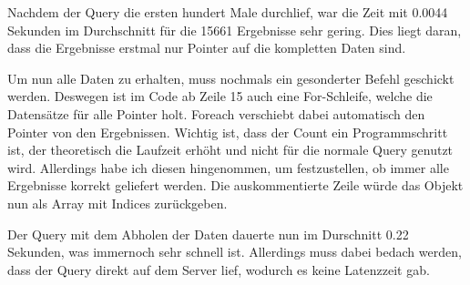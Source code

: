 Nachdem der Query die ersten hundert Male durchlief, war die Zeit mit 0.0044 Sekunden im Durchschnitt für die 15661 Ergebnisse sehr gering. Dies liegt daran, dass die Ergebnisse erstmal nur Pointer auf die kompletten Daten sind. 

Um nun alle Daten zu erhalten, muss nochmals ein gesonderter Befehl geschickt werden. Deswegen ist im Code ab Zeile 15 auch eine For-Schleife, welche die Datensätze für alle Pointer holt. Foreach verschiebt dabei automatisch den Pointer von den Ergebnissen. Wichtig ist, dass der Count ein Programmschritt ist, der theoretisch die Laufzeit erhöht und nicht für die normale Query genutzt wird. Allerdings habe ich diesen hingenommen, um festzustellen, ob immer alle Ergebnisse korrekt geliefert werden. 
Die auskommentierte Zeile würde das Objekt nun als Array mit Indices zurückgeben. 

Der Query mit dem Abholen der Daten dauerte nun im Durschnitt 0.22 Sekunden, was immernoch sehr schnell ist. Allerdings muss dabei bedach werden, dass der Query direkt auf dem Server lief, wodurch es keine Latenzzeit gab.
